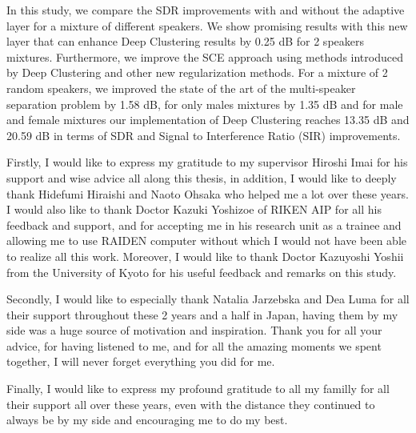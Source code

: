 \documentclass[master, tikz, final,11pt, dvipdfmx]{iscs-thesis}
\begin{document}
\begin{eabstract}
In this study, we compare the SDR improvements with and without the adaptive layer for a mixture of different speakers. We show promising results with this new layer that can enhance Deep Clustering results by 0.25 dB for 2 speakers mixtures.
Furthermore, we improve the SCE approach using methods introduced by Deep Clustering and other new regularization methods. For a mixture of 2 random speakers, we improved the state of the art of the multi-speaker separation problem by 1.58 dB, for only males mixtures by 1.35 dB and for male and female mixtures our implementation of Deep Clustering reaches 13.35 dB and 20.59 dB in terms of SDR and Signal to Interference Ratio (SIR) improvements.
\end{eabstract}

\maketitle

\begin{acknowledge}

Firstly, I would like to express my gratitude to my supervisor Hiroshi Imai for his support and wise advice all along this thesis, in addition, I would like to deeply thank Hidefumi Hiraishi and Naoto Ohsaka who helped me a lot over these years. I would also like to thank Doctor Kazuki Yoshizoe of RIKEN AIP for all his feedback and support, and for accepting me in his research unit as a trainee and allowing me to use RAIDEN computer without which I would not have been able to realize all this work. Moreover, I would like to thank Doctor Kazuyoshi Yoshii from the University of Kyoto for his useful feedback and remarks on this study.

Secondly, I would like to especially thank Natalia Jarzebska and Dea Luma for all their support throughout these 2 years and a half in Japan, having them by my side was a huge source of motivation and inspiration. Thank you for all your advice, for having listened to me, and for all the amazing moments we spent together, I will never forget everything you did for me.

Finally, I would like to express my profound gratitude to all my familly for all their support all over these years, even with the distance they continued to always be by my side and encouraging me to do my best.

\end{acknowledge}

\end{document}

